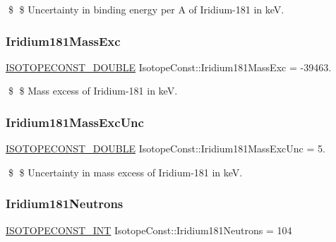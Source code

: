 \$ \$ Uncertainty in binding energy per A of Iridium-\/181 in keV. \mbox{\label{group___isotope_const-_iridium-_ir181_ga4dd0cbc652300ac493b624d147529eac}} 
\subsubsection{\texorpdfstring{Iridium181\+Mass\+Exc}{Iridium181MassExc}}
{\footnotesize\ttfamily \mbox{\hyperlink{group___isotope_const-_macros_ga8f45a7272ce02c0b4c65c44636ed719a}{I\+S\+O\+T\+O\+P\+E\+C\+O\+N\+S\+T\+\_\+\+D\+O\+U\+B\+LE}} Isotope\+Const\+::\+Iridium181\+Mass\+Exc = -\/39463.}

\$ \$ Mass excess of Iridium-\/181 in keV. \mbox{\label{group___isotope_const-_iridium-_ir181_gae44b7e1da5deb9b37586fbd07c82879b}} 
\subsubsection{\texorpdfstring{Iridium181\+Mass\+Exc\+Unc}{Iridium181MassExcUnc}}
{\footnotesize\ttfamily \mbox{\hyperlink{group___isotope_const-_macros_ga8f45a7272ce02c0b4c65c44636ed719a}{I\+S\+O\+T\+O\+P\+E\+C\+O\+N\+S\+T\+\_\+\+D\+O\+U\+B\+LE}} Isotope\+Const\+::\+Iridium181\+Mass\+Exc\+Unc = 5.}

\$ \$ Uncertainty in mass excess of Iridium-\/181 in keV. \mbox{\label{group___isotope_const-_iridium-_ir181_ga74da23632dfb9a040200232914587531}} 
\subsubsection{\texorpdfstring{Iridium181\+Neutrons}{Iridium181Neutrons}}
{\footnotesize\ttfamily \mbox{\hyperlink{group___isotope_const-_macros_ga5f18360b3e99483a35c32d789e62621c}{I\+S\+O\+T\+O\+P\+E\+C\+O\+N\+S\+T\+\_\+\+I\+NT}} Isotope\+Const\+::\+Iridium181\+Neutrons = 104}

